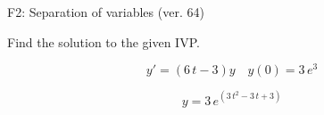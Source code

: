 \begin{exercise}
  \begin{exerciseTitle}F2: Separation of variables (ver. 64)\end{exerciseTitle}
  \begin{exerciseStatement}
    
Find the solution to the given IVP.

    
\[y'=( 6 \, t - 3 )y\hspace{1em} y(0)= 3 \, e^{3}\]

  \end{exerciseStatement}
  \begin{exerciseAnswer}
    
\[y= 3 \, e^{\left(3 \, t^{2} - 3 \, t + 3\right)}\]

  \end{exerciseAnswer}
\end{exercise}